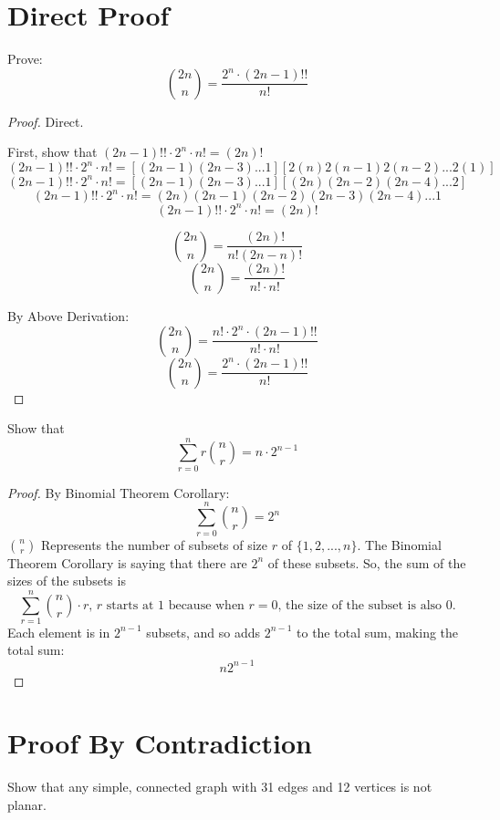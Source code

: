 \documentclass[12pt]{article}
\begin{document}
\newpage
\section{Direct Proof}

Prove:
$$\binom{2n}{n} = \frac{2^n \cdot (2n-1)!!}{n!}$$
\begin{proof}
Direct.

First, show that $(2n-1)!! \cdot 2^n \cdot n! = (2n)!$
$$(2n-1)!! \cdot 2^n \cdot n! = [(2n-1)(2n-3)...1][2(n)2(n-1)2(n-2)...2(1)]$$
$$(2n-1)!! \cdot 2^n \cdot n! = [(2n-1)(2n-3)...1][(2n)(2n-2)(2n-4)...2]$$
$$(2n-1)!! \cdot 2^n \cdot n! = (2n)(2n-1)(2n-2)(2n-3)(2n-4)...1$$
$$(2n-1)!! \cdot 2^n \cdot n! = (2n)!$$

$$\binom{2n}{n} = \frac{(2n)!}{n!(2n - n)!}$$
$$\binom{2n}{n} = \frac{(2n)!}{n! \cdot n!}$$

By Above Derivation:
$$\binom{2n}{n} = \frac{n! \cdot 2^n \cdot (2n-1)!!}{n! \cdot n!}$$
$$\binom{2n}{n} = \frac{2^n \cdot (2n-1)!!}{n!}$$

\end{proof}

\newpage
Show that
$$\sum_{r=0}^n r \binom{n}{r} = n\cdot 2^{n-1}$$

\begin{proof}
By Binomial Theorem Corollary:
$$\sum_{r=0}^n \binom{n}{r}= 2^n$$
$\binom{n}{r}$ Represents the number of subsets of size $r$ of $\{ 1, 2, ..., n\}$. The Binomial Theorem Corollary is saying that there are $2^n$ of these subsets. So, the sum of the sizes of the subsets is
$$\sum_{r=1}^n\binom{n}{r}\cdot r\text{, }r\text{ starts at 1 because when }r=0\text{, the size of the subset is also 0.}$$
Each element is in $2^{n-1}$ subsets, and so adds $2^{n-1}$ to the total sum, making the total sum: 
$$n2^{n-1}$$
\end{proof}

\newpage
\section{Proof By Contradiction}

Show that any simple, connected graph with 31 edges and 12 vertices is not planar.
\end{document}
